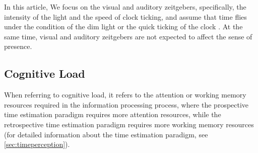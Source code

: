 \documentclass[sigconf]{acmart}
\begin{document}
In this article, We focus on the visual and auditory zeitgebers, specifically, the intensity of the light and the speed of clock ticking, and assume that time flies under the condition of the dim light or the quick ticking of the clock%
. At the same time, visual and auditory zeitgebers are not expected to affect the sense of presence.

\subsection{Cognitive Load}


When referring to cognitive load, it refers to the attention or working memory resources required in the information processing process\cite{block1997prospective}, where the prospective time estimation paradigm requires more attention resources, while the retrospective time estimation paradigm requires more working memory resources \cite{block2010cognitive} (for detailed information about the time estimation paradigm, see \ref{sec:timeperception}).

\end{document}
